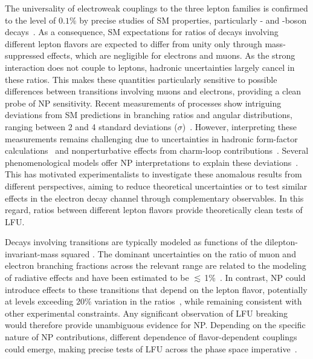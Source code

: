 The universality of electroweak couplings to the three lepton families is confirmed to the level of $0.1\%$ by precise studies of SM properties, particularly
\W- and \Z-boson decays~\cite{ALEPH:2005ab,ALEPH:2013dgf}. As a consequence, SM expectations for ratios of \bsll decays involving different lepton flavors are expected to differ
from unity only through mass-suppressed effects, which are negligible for electrons and muons. As the strong interaction does not couple to leptons, hadronic uncertainties largely cancel in these ratios. This makes these quantities particularly sensitive to possible differences between transitions involving muons and electrons, providing a clean probe of NP sensitivity.
Recent measurements of  processes show intriguing deviations from SM predictions in branching ratios and angular distributions, ranging
between 2 and 4 standard deviations ($\sigma$)~\cite{LHCb-PAPER-2015-051,LHCb-PAPER-2016-012,Belle:2016fev,LHCb-PAPER-2020-041,LHCb-PAPER-2020-002, LHCb-PAPER-2025-041}. However,
interpreting these measurements remains challenging due to uncertainties in hadronic form-factor
calculations~\cite{Parrott:2022zte,Gubernari:2023puw,Descotes-Genon:2023ukb} and nonperturbative effects from charm-loop
contributions~\cite{Khodjamirian:2010vf,Alguero:2023jeh,Isidori:2024lng}. Several phenomenological models offer NP interpretations to explain these
deviations~\cite{Descotes-Genon:2013wba,Altmannshofer:2014rta,London:2021lfn}. This has motivated experimentalists to investigate these anomalous
results from different perspectives, aiming to reduce theoretical uncertainties or to test similar effects in the electron decay channel through
complementary observables. In this regard, ratios between different lepton flavors provide theoretically clean tests of LFU.


Decays involving \bsll transitions are typically modeled as functions of the dilepton-invariant-mass squared \qsq. The dominant uncertainties on the ratio of muon and electron
branching fractions across the relevant \qsq range are related to the modeling of radiative effects and have been estimated to be
$\lesssim\,$1\%~\cite{Bordone:2016gaq, Isidori:2022bzw}. In contrast, NP could introduce effects to these transitions that depend on the lepton flavor, potentially at levels exceeding $20\%$ variation in the
ratios~\cite{Alguero:2022wkd,Crivellin:2022mff,Crivellin:2023saq,Buras:2024mnq,Allanach:2024jls}, while remaining consistent
with other experimental constraints. Any significant observation of LFU breaking would therefore
provide unambiguous evidence for NP. Depending on the specific nature of NP contributions, different \qsq dependence of flavor-dependent couplings could emerge, making precise tests of LFU across the \qsq phase space imperative~\cite{Hiller:2013cza,Sala:2017ihs}.

